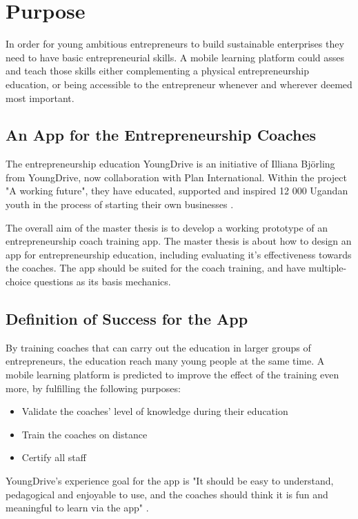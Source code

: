 \section{Purpose}
\label{purpose}

In order for young ambitious entrepreneurs to build sustainable enterprises they need to have basic entrepreneurial skills. A mobile learning platform could asses and teach those skills either complementing a physical entrepreneurship education, or being accessible to the entrepreneur whenever and wherever deemed most important.

\subsection{An App for the Entrepreneurship Coaches}
The entrepreneurship education YoungDrive is an initiative of Illiana Björling from YoungDrive, now collaboration with Plan International. Within the project "A working future", they have educated, supported and inspired 12 000 Ugandan youth in the process of starting their own businesses \citep{nissar}.

The overall aim of the master thesis is to develop a working prototype of an entrepreneurship coach training app. The master thesis is about how to design an app for entrepreneurship education, including evaluating it's effectiveness towards the coaches. The app should be suited for the coach training, and have multiple-choice questions as its basis mechanics.

\subsection{Definition of Success for the App}

By training coaches that can carry out the education in larger groups of entrepreneurs, the education reach many young people at the same time. A mobile learning platform is predicted to improve the effect of the training even more, by fulfilling the following purposes:

\begin{itemize}
  \item Validate the coaches' level of knowledge during their education
    \item Train the coaches on distance
    \item Certify all staff
\end{itemize}

YoungDrive's experience goal for the app is "It should be easy to understand, pedagogical and enjoyable to use, and the coaches should think it is fun and meaningful to learn via the app" \citep{youngdrive-masterthesis-idea}.
